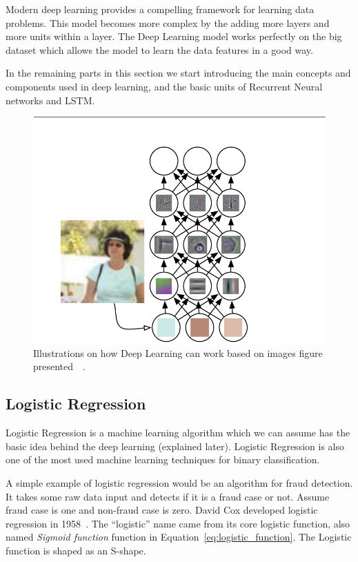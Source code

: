 Modern deep learning provides a compelling framework for learning data problems. This model becomes more complex by the adding more layers and more units within a layer. The Deep Learning model works perfectly on the big dataset which allows the model to learn the data features in a good way.

In the remaining parts in this section we start introducing the main concepts and components used in deep learning, and the basic units of Recurrent Neural networks and LSTM.%
\begin{figure}[!t] \includegraphics[width=\linewidth]{./Figures/Ch_2_Background/DeepLearningImagePersonExample.png}
 \caption{Illustrations on how Deep Learning can work based on images figure presented~\cite{Goodfellow-et-al-2016}~\cite{Zeiler2014}.}
 \label{Fig:Deep_Learning_Image_Person_Example}
\end{figure}

\subsection{Logistic Regression}


Logistic Regression is a machine learning algorithm which we can assume has the basic idea behind the deep learning (explained later). Logistic Regression is also one of the most used machine learning techniques for binary classification.

A simple example of logistic regression would be an algorithm for fraud detection. It takes some raw data input and detects if it is a fraud case or not. Assume fraud case is one and non-fraud case is zero. David Cox developed logistic regression in 1958~\cite{Cox2958}. The “logistic” name came from its core logistic function, also named \textit{Sigmoid function} function in Equation~\eqref{eq:logistic_function}. The Logistic function is shaped as an S-shape.

